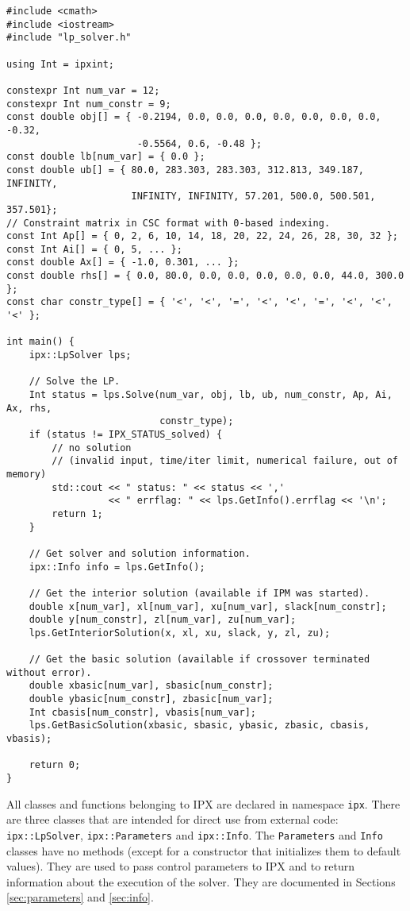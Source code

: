\documentclass{article}
\newcommand{\ct}{\texttt}
\begin{document}
\newpage
\begin{verbatim}
#include <cmath>
#include <iostream>
#include "lp_solver.h"

using Int = ipxint;

constexpr Int num_var = 12;
constexpr Int num_constr = 9;
const double obj[] = { -0.2194, 0.0, 0.0, 0.0, 0.0, 0.0, 0.0, 0.0, -0.32,
                       -0.5564, 0.6, -0.48 };
const double lb[num_var] = { 0.0 };
const double ub[] = { 80.0, 283.303, 283.303, 312.813, 349.187, INFINITY,
                      INFINITY, INFINITY, 57.201, 500.0, 500.501, 357.501};
// Constraint matrix in CSC format with 0-based indexing.
const Int Ap[] = { 0, 2, 6, 10, 14, 18, 20, 22, 24, 26, 28, 30, 32 };
const Int Ai[] = { 0, 5, ... };
const double Ax[] = { -1.0, 0.301, ... };
const double rhs[] = { 0.0, 80.0, 0.0, 0.0, 0.0, 0.0, 0.0, 44.0, 300.0 };
const char constr_type[] = { '<', '<', '=', '<', '<', '=', '<', '<', '<' };

int main() {
    ipx::LpSolver lps;

    // Solve the LP.
    Int status = lps.Solve(num_var, obj, lb, ub, num_constr, Ap, Ai, Ax, rhs,
                           constr_type);
    if (status != IPX_STATUS_solved) {
        // no solution
        // (invalid input, time/iter limit, numerical failure, out of memory)
        std::cout << " status: " << status << ','
                  << " errflag: " << lps.GetInfo().errflag << '\n';
        return 1;
    }

    // Get solver and solution information.
    ipx::Info info = lps.GetInfo();

    // Get the interior solution (available if IPM was started).
    double x[num_var], xl[num_var], xu[num_var], slack[num_constr];
    double y[num_constr], zl[num_var], zu[num_var];
    lps.GetInteriorSolution(x, xl, xu, slack, y, zl, zu);

    // Get the basic solution (available if crossover terminated without error).
    double xbasic[num_var], sbasic[num_constr];
    double ybasic[num_constr], zbasic[num_var];
    Int cbasis[num_constr], vbasis[num_var];
    lps.GetBasicSolution(xbasic, sbasic, ybasic, zbasic, cbasis, vbasis);

    return 0;
}
\end{verbatim}

\newpage
All classes and functions belonging to IPX are declared in namespace \ct{ipx}.
There are three classes that are intended for direct use from external code:
\ct{ipx::LpSolver}, \ct{ipx::Parameters} and \ct{ipx::Info}. The \ct{Parameters}
and \ct{Info} classes have no methods (except for a constructor that initializes
them to default values). They are used to pass control parameters to IPX and to
return information about the execution of the solver. They are documented in
Sections \ref{sec:parameters} and \ref{sec:info}.
\end{document}
